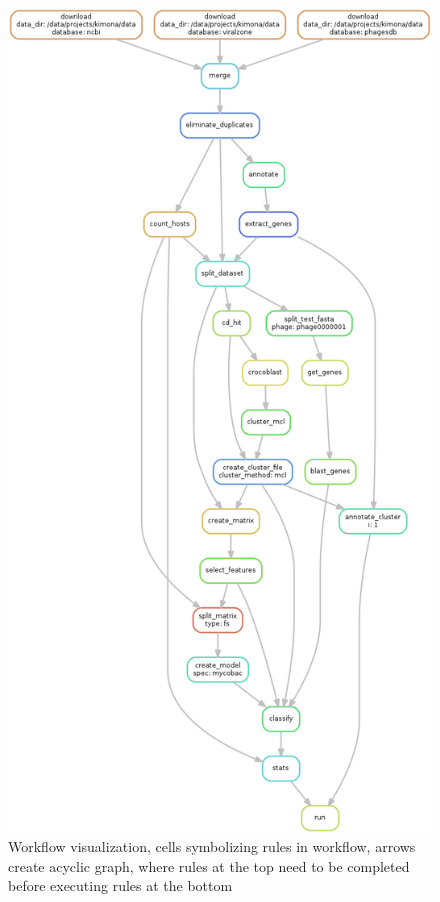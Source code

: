 \begin{figure}[h]
\includegraphics[height=0.9\textheight]{./images/mcl.png}
\centering
\caption[Workflow visualization]{Workflow visualization, cells symbolizing rules in workflow, arrows create acyclic graph, where rules at the top need to be completed before executing rules at the bottom}
\label{fig:dag}
\end{figure}

